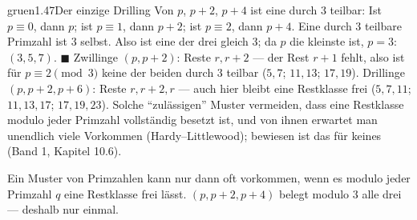 \begin{loesungkarte}{gruen}{1.47}{Der einzige Drilling}
Von $p$, $p + 2$, $p + 4$ ist eine durch $3$ teilbar: Ist $p\equiv0$, dann $p$; ist $p\equiv1$, dann $p + 2$; ist $p\equiv2$, dann $p + 4$. Eine durch $3$ teilbare Primzahl ist $3$ selbst. Also ist eine der drei gleich $3$; da $p$ die kleinste ist, $p = 3$: $(3, 5, 7)$. $\blacksquare$
Zwillinge $(p, p + 2)$: Reste $r, r + 2$ --- der Rest $r + 1$ fehlt, also ist für $p\equiv2\pmod3$ keine der beiden durch $3$ teilbar ($5, 7$; $11, 13$; $17, 19$). Drillinge $(p, p + 2, p + 6)$: Reste $r, r + 2, r$ --- auch hier bleibt eine Restklasse frei ($5, 7, 11$; $11, 13, 17$; $17, 19, 23$). Solche \enquote{zulässigen} Muster vermeiden, dass eine Restklasse modulo jeder Primzahl vollständig besetzt ist, und von ihnen erwartet man unendlich viele Vorkommen (Hardy--Littlewood); bewiesen ist das für keines (Band 1, Kapitel 10.6).
\begin{mitnehmen}\kastentext
Ein Muster von Primzahlen kann nur dann oft vorkommen, wenn es modulo jeder Primzahl $q$ eine Restklasse frei lässt. $(p, p + 2, p + 4)$ belegt modulo $3$ alle drei --- deshalb nur einmal.
\end{mitnehmen}
\end{loesungkarte}

